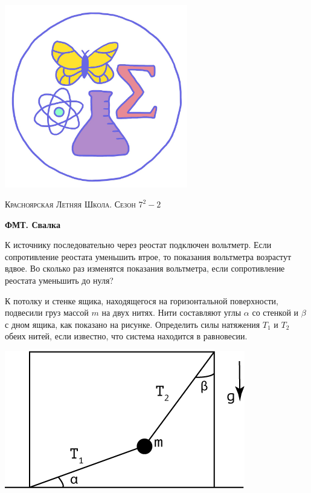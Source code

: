 \colorbox{white!10!}{
    \begin{minipage}{0.2\textwidth}
       \begin{flushleft}
        \includegraphics[width = 0.6\textwidth]{Эмблема.png}
       \end{flushleft}
    \end{minipage}
    \begin{minipage}[t]{0.7 \textwidth}
        \begin{center}
            {\huge \textsc{Красноярская Летняя Школа. Сезон $7^2 - 2$}}
            \vspace{0.25cm}
            
            { \huge \textbf{ФМТ. Свалка}}
        \end{center}
        \vspace{0.05cm}
    \end{minipage}
}

\begin{enumerate}
    \item К источнику последовательно через реостат подключен вольтметр. Если сопротивление реостата уменьшить втрое, то показания вольтметра возрастут вдвое. Во сколько раз изменятся показания вольтметра, если сопротивление реостата уменьшить до нуля?
    
    \parbox[b]{.7\textwidth}{
    \item 	К потолку и стенке ящика, находящегося на горизонтальной поверхности, подвесили груз массой $m$ на двух нитях. Нити составляют углы $\alpha$ со стенкой и $\beta$ с дном ящика, как показано на рисунке. Определить силы натяжения $T_1$ и $T_2$ обеих нитей, если известно, что система находится в равновесии.
	}\hfill\includegraphics[width=.3\textwidth]{pictures/Svalka.png}

\end{enumerate}